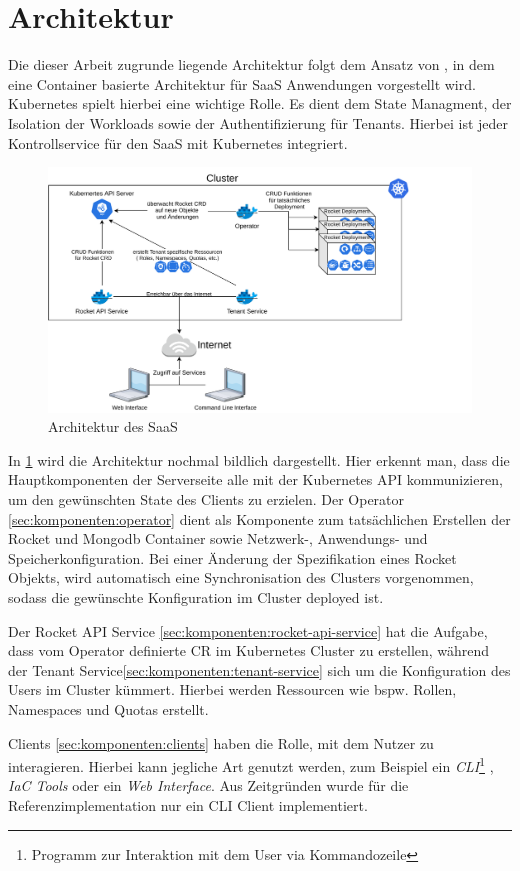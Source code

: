 \section{Architektur}
\label{sec:komponenten:architektur}

Die dieser Arbeit zugrunde liegende Architektur folgt dem Ansatz von \cite{Truyen2016}, in dem eine Container basierte
Architektur für \ac{SaaS} Anwendungen vorgestellt wird. Kubernetes spielt hierbei eine wichtige Rolle. Es dient dem State
Managment, der Isolation der Workloads sowie der Authentifizierung für Tenants. Hierbei ist jeder Kontrollservice für den \ac{SaaS}
mit Kubernetes integriert.

\begin{figure}[h]
  \includegraphics[width=45em]{gfx/chapters/3_komponenten/saas_architecture.pdf}
  \caption{Architektur des \ac{SaaS}}
  \label{fig:architektur}
\end{figure}

In \ref{fig:architektur} wird die Architektur nochmal bildlich dargestellt.
Hier erkennt man, dass die Hauptkomponenten der Serverseite alle mit der Kubernetes API kommunizieren,
um den gewünschten State des Clients zu erzielen. Der Operator \ref{sec:komponenten:operator} dient als Komponente zum tatsächlichen
Erstellen der Rocket und Mongodb Container sowie Netzwerk-, Anwendungs- und Speicherkonfiguration.
Bei einer Änderung der Spezifikation eines Rocket Objekts, wird automatisch eine Synchronisation des 
Clusters vorgenommen, sodass die gewünschte Konfiguration im Cluster deployed ist.

Der Rocket API Service \ref{sec:komponenten:rocket-api-service} hat die Aufgabe, 
dass vom Operator definierte \ac{CR} im Kubernetes Cluster zu erstellen, während der Tenant Service\ref{sec:komponenten:tenant-service}
sich um die Konfiguration des Users im Cluster kümmert.
Hierbei werden Ressourcen wie bspw. Rollen, Namespaces und Quotas erstellt.

Clients \ref{sec:komponenten:clients} haben die Rolle, mit dem Nutzer zu interagieren. Hierbei kann jegliche Art genutzt werden,
zum Beispiel ein \emph{\ac{CLI}}\footnote{Programm zur Interaktion mit dem User via Kommandozeile}
, \emph{\ac{IaC} Tools} oder ein \emph{Web Interface}. Aus Zeitgründen wurde für die Referenzimplementation nur
ein \ac{CLI} Client implementiert.
